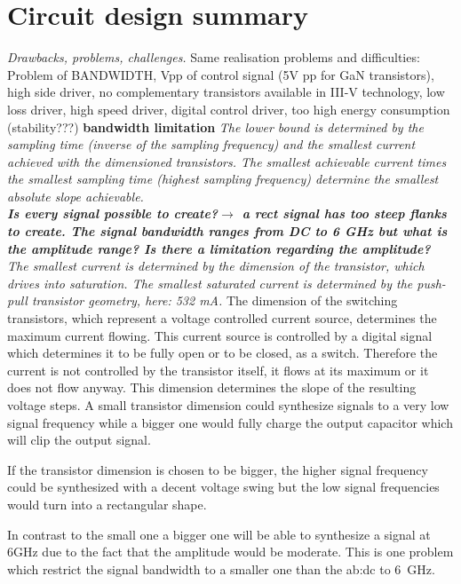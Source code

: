 \section{Circuit design summary}
\textit{Drawbacks, problems, challenges.}
Same realisation problems and difficulties: Problem of BANDWIDTH, Vpp of control signal (5V pp for GaN transistors), high side driver, no complementary transistors available in III-V technology, low loss driver, high speed driver, digital control driver, too high energy consumption (stability???)
\textbf{bandwidth limitation}
\textit{The lower bound is determined by the sampling time (inverse of the sampling frequency) and the smallest current achieved with the dimensioned transistors.
 The smallest achievable current times the smallest sampling time (highest sampling frequency) determine the smallest absolute slope achievable. \\
 \textbf{Is every signal possible to create?$\rightarrow$ a rect signal has too steep flanks to create. The signal bandwidth ranges from DC to 6 GHz but what is the amplitude range? Is there a limitation regarding the amplitude?}
\\
The smallest current is determined by the dimension of the transistor, which drives into saturation. 
The smallest saturated current is determined by the push-pull transistor geometry, here: 532 mA.}
The dimension of the switching transistors, which represent a voltage controlled current source, determines the maximum current flowing.
This current source is controlled by a digital signal which determines it to be fully open or to be closed, as a switch.
Therefore the current is not controlled by the transistor itself, it flows at its maximum or it does not flow anyway.
This dimension determines the slope of the resulting voltage steps.
A small transistor dimension could synthesize signals to a very low signal frequency while a bigger one would fully charge the output capacitor which will clip the output signal.

If the transistor dimension is chosen to be bigger, the higher signal frequency could be synthesized with a decent voltage swing but the low signal frequencies would turn into a rectangular shape. 

In contrast to the small one a bigger one will be able to synthesize a signal at 6GHz due to the fact that the amplitude would be moderate.
This is one problem which restrict the signal bandwidth to a smaller one than the \gls{ab:dc} to \SI{6}{\GHz}.